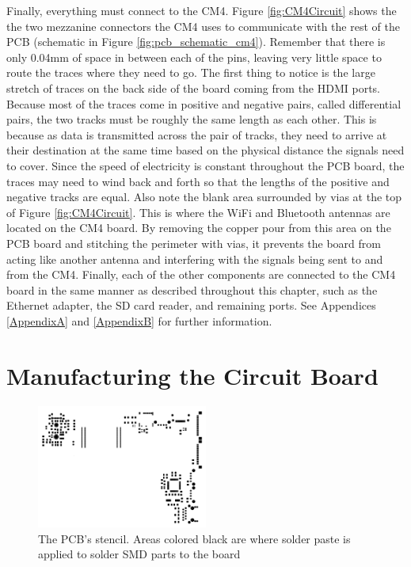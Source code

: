 Finally, everything must connect to the CM4.
Figure \ref{fig:CM4Circuit} shows the the two mezzanine connectors the CM4 uses to communicate with the rest of the PCB (schematic in Figure \ref{fig:pcb_schematic_cm4}).
Remember that there is only 0.04mm of space in between each of the pins, leaving very little space to route the traces where they need to go.
The first thing to notice is the large stretch of traces on the back side of the board coming from the HDMI ports.
Because most of the traces come in positive and negative pairs, called differential pairs, the two tracks must be roughly the same length as each other.
This is because as data is transmitted across the pair of tracks, they need to arrive at their destination at the same time based on the physical distance the signals need to cover.
Since the speed of electricity is constant throughout the PCB board, the traces may need to wind back and forth so that the lengths of the positive and negative tracks are equal.
Also note the blank area surrounded by vias at the top of Figure \ref{fig:CM4Circuit}.
This is where the WiFi and Bluetooth antennas are located on the CM4 board.
By removing the copper pour from this area on the PCB board and stitching the perimeter with vias, it prevents the board from acting like another antenna and interfering with the signals being sent to and from the CM4.
Finally, each of the other components are connected to the CM4 board in the same manner as described throughout this chapter, such as the Ethernet adapter, the SD card reader, and remaining ports.
See Appendices \ref{AppendixA} and \ref{AppendixB} for further information.


\section{Manufacturing the Circuit Board}\label{sec:ManufacturingThePCB}

\begin{figure}[t]
  \centering
  \includegraphics[width=0.5\textwidth]{Figures/kicad/close-ups/stencil}
  \caption[PCB Stencil]{The PCB's stencil. Areas colored black are where solder paste is applied to solder SMD parts to the board}
  \label{fig:PCBStencil}
\end{figure}

